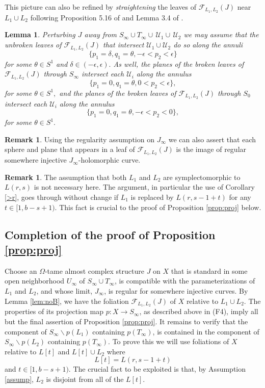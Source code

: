 \documentclass[12pt]{amsart}
\newtheorem{lemma}[theorem]{Lemma}
\theoremstyle{definition}
\newtheorem{remark}[theorem]{Remark}
\begin{document}
This picture can also be refined by {\it straightening} the leaves of $\mathcal{F}_{L_1,L_2}(J)$ near $L_1 \cup L_2$ following 
Proposition 5.16 of \cite{rgi} and Lemma 3.4 of \cite{hiker}.

\begin{lemma} Perturbing $J$ away from  $S_\infty \cup T_\infty \cup\,\mathcal{U}_1 \cup \,\mathcal{U}_2$ we may assume that the unbroken leaves of 
 $\mathcal{F}_{L_1,L_2}(J)$ that intersect $ \mathcal{U}_1 \cup \mathcal{U}_2$ do so along the annuli $$\{p_1=\delta, q_1= \theta, -\epsilon <p_2<\epsilon\}$$ for some $\theta \in S^1$ and $\delta \in (-\epsilon, \epsilon).$  As well, the planes of the broken leaves of $\mathcal{F}_{L_1,L_2}(J)$ through  $S_\infty$ intersect each $\mathcal{U}_i$ along the annulus $$\{p_1 = 0, q_1 =
\theta , 0 < p_2 < \epsilon \},$$ for some $ \theta \in S^1,$  and the planes of the broken leaves of $\mathcal{F}_{L_1,L_2}(J)$ through  $S_0$ intersect each $\mathcal{U}_i$ along the annulus $$\{p_1 = 0, q_1 =
\theta , -\epsilon < p_2 < 0 \},$$ for some $ \theta \in S^1.$
\end{lemma}

\begin{remark}\label{rem:reg}
 Using the regularity assumption on $J_\infty$ we can also assert that each sphere and plane that appears in a leaf of $\mathcal{F}_{L_1,L_2}(J)$ is the image of regular somewhere injective $J_{\infty}$-holomorphic curve.
\end{remark}

\begin{remark}\label{rem:flex}
The assumption that both $L_1$ and $L_2$ are symplectomorphic to $L(r,s)$ is not necessary here. The argument, in particular the use of Corollary \ref{>r}, goes through without change if $L_1$ is replaced by  $L(r, s-1+t)$ for any $t \in [1, b-s+1).$ This fact is crucial to the proof of Proposition \ref{prop:proj} below.
\end{remark}



\subsection{Completion of the proof of Proposition \ref{prop:proj}}
Choose an $\Omega$-tame almost complex structure $J$ on $X$ that is standard in some open neighborhood $U_\infty$ of $S_{\infty} \cup T_{\infty}$, is compatible with the parameterizations of $L_1$ and $L_2$, and whose limit, $J_{\infty}$, is regular for somewhere injective curves. By Lemma \ref{lem:noB}, we have the foliation $\mathcal{F}_{L_1,L_2}(J)$ of $X$ relative to $L_1 \cup L_2$. The properties of its projection map $p \colon X \to  S_{\infty}$, as described above in (F4), imply all but the final assertion of Proposition \ref{prop:proj}.  It remains to verify that the component of $S_\infty \smallsetminus p(L_1)$ containing $p(T_\infty)$,  is contained in the component of $S_\infty \smallsetminus p(L_2)$ containing $p(T_\infty)$. To prove this
we will use foliations of $X$ relative to $L[t]$ and $L[t] \cup L_2$  where $$L[t]= L(r, s-1+t)$$ and $t \in [1, b -s +1).$
The crucial fact to be exploited is that, by Assumption \ref{assump}, $L_2$ is disjoint from all of the $L[t]$.
\end{document}
